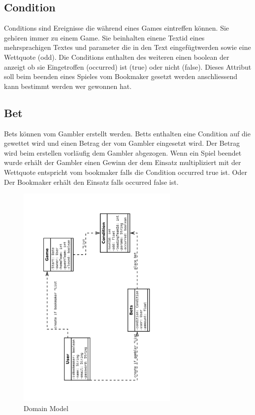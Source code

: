 \documentclass[a4paper, abstracton]{scrartcl}
\begin{document}
  \subsection{Condition}
    Conditions sind Ereignisse die während eines Games eintreffen können.
    Sie gehören immer zu einem Game.
    Sie beinhalten einene Textid eines mehrsprachigen Textes und parameter
    die in den Text eingefügtwerden sowie eine Wettquote (odd).  
    Die Conditions enthalten des weiteren einen boolean der anzeigt ob
    sie Eingetroffen (occurred) ist (true) oder nicht (false).
    Dieses Attribut soll beim beenden eines Spieles vom Bookmaker gesetzt
    werden anschliessend kann bestimmt werden wer gewonnen hat.
     
  \subsection{Bet}
    Bets können vom Gambler erstellt werden.
    Betts enthalten eine Condition auf die gewettet wird und einen Betrag
    der vom Gambler eingesetzt wird. Der Betrag wird beim erstellen vorläufig
    dem Gambler abgezogen. Wenn ein Spiel beendet wurde erhält der Gambler
    einen Gewinn der dem Einsatz multipliziert mit der Wettquote entspricht
    vom bookmaker falls die Condition occurred true ist. Oder Der Bookmaker
    erhält den Einsatz falls occurred false ist. 

  \begin{figure}[h!]
  \begin{center}
    \includegraphics[width=0.7\textwidth,angle=-90]{images/DomainModel.pdf}
  \end{center}
  \caption{Domain Model}
  \label{fig:domain_model}
\end{figure}
\end{document}
